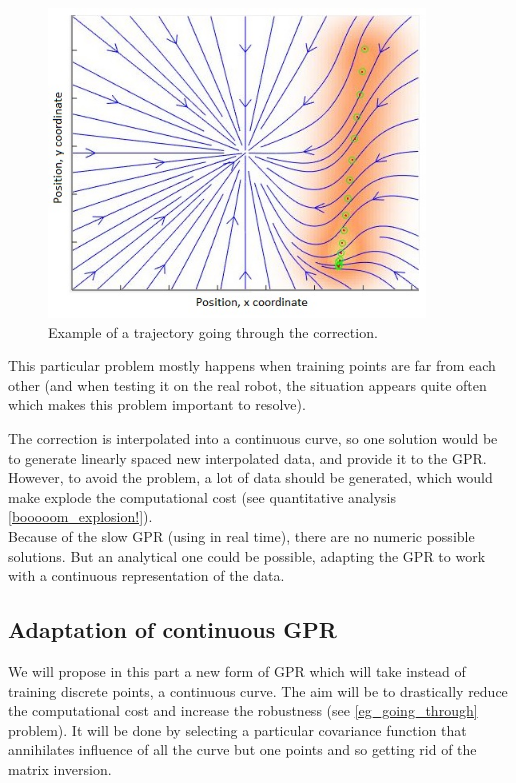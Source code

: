\begin{figure}[H]
\centering
\includegraphics[width=10cm]{img/gpr_fail_thatswhy.jpg}
\caption{Example of a trajectory going through the correction.}
\label{eg_going_through}
\end{figure}

This particular problem mostly happens when training points are far from each other (and when testing it on the real robot, the situation appears quite often which makes this problem important to resolve).

The correction is interpolated into a continuous curve, so one solution would be to generate linearly spaced new interpolated data, and provide it to the GPR. However, to avoid the problem, a lot of data should be generated, which would make explode the computational cost (see quantitative analysis \autoref{booooom_explosion!}).\\
Because of the slow GPR (using in real time), there are no numeric possible solutions. But an analytical one could be possible, adapting the GPR to work with a continuous representation of the data.


\subsection{Adaptation of continuous GPR}

We will propose in this part a new form of GPR which will take instead of training discrete points, a continuous curve. The aim will be to drastically reduce the computational cost and increase the robustness (see \autoref{eg_going_through} problem). It will be done by selecting a particular covariance function that annihilates influence of all the curve but one points and so getting rid of the matrix inversion.

